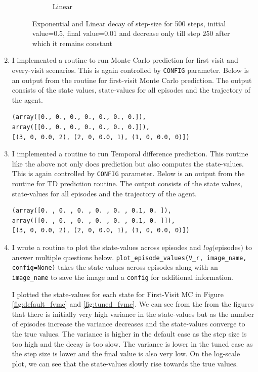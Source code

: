 \begin{enumerate}
\begin{figure}[h]
\begin{subfigure}[b]{0.45\textwidth}
            \caption{Linear}
            \label{fig:linear_step_size_decay}
        \end{subfigure}
        \caption{Exponential and Linear decay of step-size for 500 steps, initial value=$0.5$, final value=$0.01$ and decrease only till step $250$ after which it remains constant}
    \end{figure}

    \item I implemented a routine to run Monte Carlo prediction for first-visit and every-visit scenarios. This is again controlled by \texttt{CONFIG} parameter. Below is an output from the routine for first-visit Monte Carlo prediction. The output consists of the state values, state-values for all episodes and the trajectory of the agent.
    \begin{verbatim}
(array([0., 0., 0., 0., 0., 0., 0.]),
array([[0., 0., 0., 0., 0., 0., 0.]]),
[(3, 0, 0.0, 2), (2, 0, 0.0, 1), (1, 0, 0.0, 0)])
    \end{verbatim}

    \item I implemented a routine to run Temporal difference prediction. This routine like the above not only does prediction but also computes the state-values. This is again controlled by \texttt{CONFIG} parameter. Below is an output from the routine for TD prediction routine. The output consists of the state values, state-values for all episodes and the trajectory of the agent.
    \begin{verbatim}
(array([0. , 0. , 0. , 0. , 0. , 0.1, 0. ]),
array([[0. , 0. , 0. , 0. , 0. , 0.1, 0. ]]),
[(3, 0, 0.0, 2), (2, 0, 0.0, 1), (1, 0, 0.0, 0)])
    \end{verbatim}
    \item I wrote a routine to plot the state-values across episodes and $log($episodes$)$ to answer multiple questions below. \texttt{plot\_episode\_values(V\_r, image\_name, config=None)} takes the state-values across episodes along with an \texttt{image\_name} to save the image and a \texttt{config} for additional information.

    I plotted the state-values for each state for First-Visit MC in Figure \ref{fig:default_fvmc} and \ref{fig:tuned_fvmc}. We can see from the from the figures that there is initially very high variance in the state-values but as the number of episodes increase the variance decreases and the state-values converge to the true values. The variance is higher in the default case as the step size is too high and the decay is too slow. The variance is lower in the tuned case as the step size is lower and the final value is also very low. On the log-scale plot, we can see that the state-values slowly rise towards the true values.


\end{enumerate}
